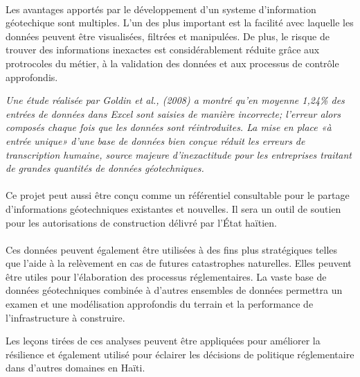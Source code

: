 \paragraph{}
Les avantages apportés par le développement d'un systeme d'information géotechique
sont multiples.
L'un des plus important est la facilité avec laquelle les données 
peuvent être visualisées, filtrées et manipulées.
De plus, le risque de trouver  des informations inexactes est considérablement
réduite grâce aux protrocoles du métier, à la validation des données et aux processus
de contrôle approfondis.

\textit{ Une 
étude réalisée par Goldin et al.,
(2008) a montré qu'en moyenne 1,24\% des entrées de données dans Excel 
sont saisies de manière incorrecte; l'erreur alors
composés chaque fois que les données sont réintroduites. La mise en place 
«à entrée unique» d’une base de données bien conçue réduit les erreurs de 
transcription humaine, source majeure d’inexactitude pour les entreprises
traitant de grandes quantités de données géotechniques.}
\cite{keen2015development}
\paragraph{}
Ce projet peut aussi être
conçu comme un référentiel consultable pour le partage d'informations 
géotechniques existantes et nouvelles.
Il sera un outil de soutien pour les autorisations de construction délivré par l'État haïtien.
\paragraph{}
\par
Ces données peuvent également être utilisées à des fins plus stratégiques telles que l'aide à la
relèvement en cas de futures catastrophes naturelles.
Elles peuvent être utiles pour  l'élaboration des processus réglementaires.
La vaste base de données géotechniques
combinée à d'autres ensembles de données permettra un examen et une modélisation approfondis du terrain
et la performance de l'infrastructure à construire. 
\par
Les leçons tirées de ces analyses peuvent être appliquées pour
améliorer la résilience et également utilisé pour éclairer les 
décisions de politique réglementaire dans d'autres domaines en Haïti.

